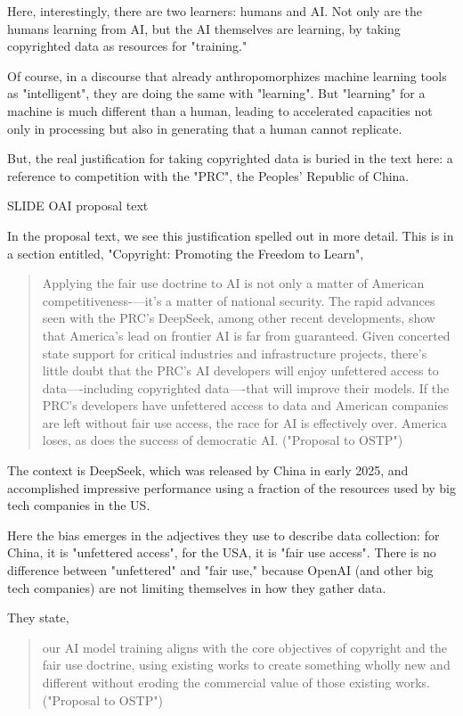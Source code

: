 \documentclass[11pt]{article}
\begin{document}
Here, interestingly, there are two learners: humans and AI. Not only
are the humans learning from AI, but the AI themselves are learning,
by taking copyrighted data as resources for "training."

Of course, in a discourse that already anthropomorphizes machine
learning tools as "intelligent", they are doing the same with
"learning". But "learning" for a machine is much different than a
human, leading to accelerated capacities not only in processing but
also in generating that a human cannot replicate.

But, the real justification for taking copyrighted data is buried in
the text here: a reference to competition with the "PRC", the Peoples'
Republic of China.

SLIDE OAI proposal text 

In the proposal text, we see this justification spelled out in more
detail. This is in a section entitled, "Copyright: Promoting the
Freedom to Learn",

\begin{quote}
Applying the fair use doctrine to AI is not only a matter of American
competitiveness-—it’s a matter of national security. The rapid
advances seen with the PRC’s DeepSeek, among other recent
developments, show that America’s lead on frontier AI is far from
guaranteed. Given concerted state support for critical industries and
infrastructure projects, there’s little doubt that the PRC’s AI
developers will enjoy unfettered access to data—-including copyrighted
data—-that will improve their models. If the PRC’s developers have
unfettered access to data and American companies are left without fair
use access, the race for AI is effectively over. America loses, as
does the success of democratic AI. ("Proposal to OSTP")
\end{quote}

The context is DeepSeek, which was released by China in early 2025,
and accomplished impressive performance using a fraction of the
resources used by big tech companies in the US.

Here the bias emerges in the adjectives they use to describe data
collection: for China, it is "unfettered access", for the USA, it is
"fair use access". There is no difference between "unfettered" and
"fair use," because OpenAI (and other big tech companies) are not
limiting themselves in how they gather data.

They state,

\begin{quote}
our AI model training aligns with the core objectives of copyright and
the fair use doctrine, using existing works to create something wholly
new and different without eroding the commercial value of those
existing works. ("Proposal to OSTP")
\end{quote}
\end{document}
